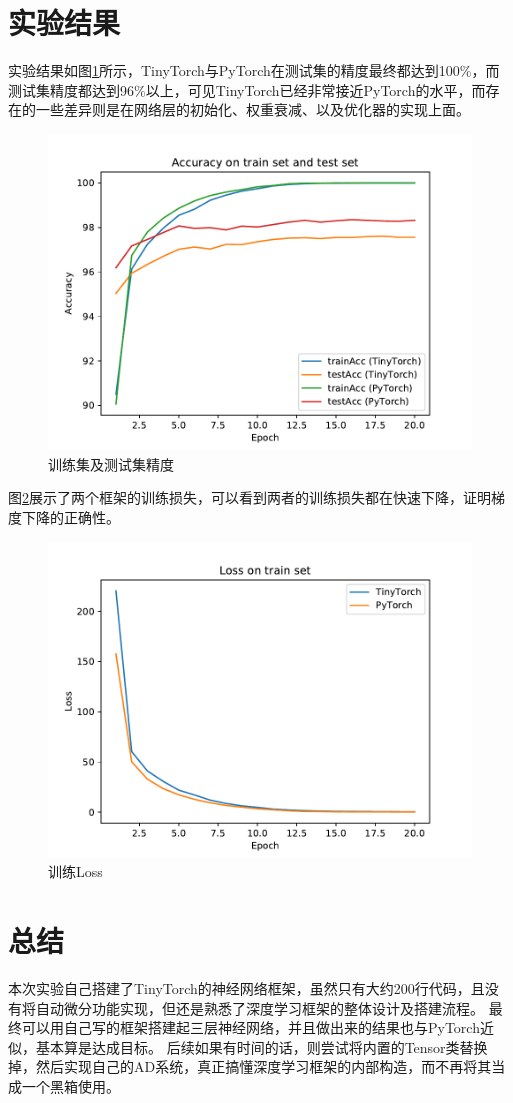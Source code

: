 \documentclass[logo,reportComp]{thesis}
\begin{document}
\section{实验结果}
实验结果如图\ref{fig:acc}所示，TinyTorch与PyTorch在测试集的精度最终都达到100\%，而测试集精度都达到96\%以上，可见TinyTorch已经非常接近PyTorch的水平，而存在的一些差异则是在网络层的初始化、权重衰减、以及优化器的实现上面。
\begin{figure}[H]
\centering
\includegraphics[width=0.6\linewidth]{fig/acc.pdf}
\caption{训练集及测试集精度}
\label{fig:acc}
\end{figure}

图\ref{fig:loss}展示了两个框架的训练损失，可以看到两者的训练损失都在快速下降，证明梯度下降的正确性。
\begin{figure}[H]
\centering
\includegraphics[width=0.6\linewidth]{fig/loss.pdf}
\caption{训练Loss}
\label{fig:loss}
\end{figure}

\section{总结}
本次实验自己搭建了TinyTorch的神经网络框架，虽然只有大约200行代码，且没有将自动微分功能实现，但还是熟悉了深度学习框架的整体设计及搭建流程。
最终可以用自己写的框架搭建起三层神经网络，并且做出来的结果也与PyTorch近似，基本算是达成目标。
后续如果有时间的话，则尝试将内置的Tensor类替换掉，然后实现自己的AD系统，真正搞懂深度学习框架的内部构造，而不再将其当成一个黑箱使用。
\end{document}
